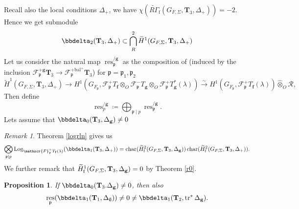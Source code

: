 \documentclass[10pt]{amsart}
\numberwithin{equation}{section}
\newtheorem{prop}[thm]{Proposition}
\theoremstyle{definition}
\theoremstyle{remark} %
\newtheorem{rmk}[thm]{Remark}
\DeclareMathOperator{\Char}{char}
\newcommand{\Log}{\operatorname{Log}}
\DeclareMathOperator{\res}{res}
\DeclareMathOperator{\tr}{{tr}^*}
\newcommand{\f}{\mathbf{f}}
\newcommand{\scrF}{\mathscr{F}}
\newcommand{\g}{\mathbf{g}}
\newcommand{\p}{\mathfrak{p}}
\newcommand{\R}{\mathcal{R}}
\newcommand{\T}{\mathbf{T}}
\begin{document}
		Recall also the local conditions $ \Delta_+ $, we have $ \chi(\widetilde{R\Gamma}_{\mathrm{f}}(G_{F,\Sigma}, \T_{3}, \Delta_+)) =-2 $. Hence we get submodule $$ \bbdelta_2(\T_{3},\Delta_{+}) \subset \bigcap^2_R \widetilde{H}^1(G_{F,\Sigma}, \T_{3}, \Delta_+) $$
		Let us consider the natural map $ \res^{/\g}_\p $ as the composition of (induced by the inclusion $ \scrF^{+\g}_{\p} \T_{3} \rightarrow \scrF^{+\mathrm{bal}^+}_{\p} \T_{3} $) for $ \p = \p_1,\p_2  $
		\begin{equation*}
			\widetilde{H}^1(G_{F,\Sigma}, \T_{3}, \Delta_+) \rightarrow H^1(G_{F_{\p}}, \scrF^+_{\p}T_{\f} \otimes_O \scrF^-_{\p}T_{\g} \otimes_O \scrF^+_{\p}T_{\g}^*(\lambda)) \xrightarrow{\sim}  H^1(G_{F_{\p}}, \scrF^+_{\p}T_{\f}(\lambda)) \widehat{\otimes}_O \R,
		\end{equation*}
		Then define 
		\[\res^{/\g}_p \coloneqq \bigoplus_{\p \mid p} \res^{/\g}_\p.\]
		Lets assume that $ \bbdelta_0(\T_{3},\Delta_{\g}) \ne 0 $
		\begin{rmk}
			\label{remark_T3}
			Theorem \ref{logrln} gives us
			$$ \bigotimes_{\p \mid p}\Log_{\scrF^+_{\p} T_\f(\lambda)} (\bbdelta_1(\T_{3},\Delta_{+})) = \Char (\widetilde{H}^2_{\mathrm{f}}(G_{F,\Sigma}, \T_3, \Delta_{\g})) \Char(\widetilde{H}^2_{\mathrm{f}}(G_{F,\Sigma}, \T_3, \Delta_{+})) .$$
			We further remark that $ \widetilde{H}_{\rm f}^1(G_{F,\Sigma},\T_{3}, \Delta_{\g}) =0 $ by Theorem \ref{r0}.
		\end{rmk}
		\begin{prop}
			If $ \bbdelta_0(\T_{3}.\Delta_\g) \ne 0 $, then also 
			$$ \res_{\p}(\bbdelta_1(\T_{1}, \Delta_\emptyset)) \ne 0 \ne \bbdelta_1(\T_{2}, \tr\Delta_\g). $$
		\end{prop}
\end{document}
